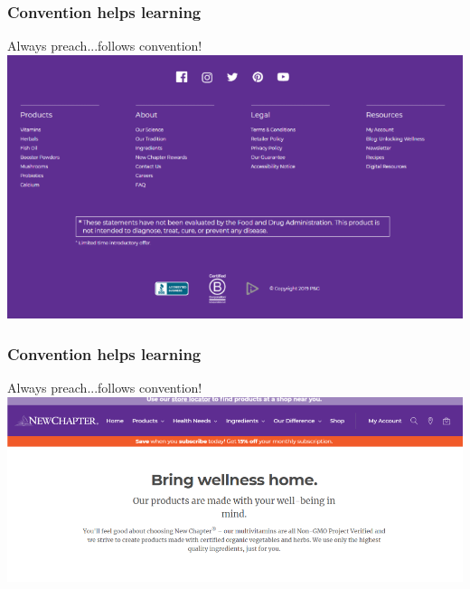 \documentclass{beamer}
\begin{document}
%
%


\begin{frame}
	\frametitle{Convention helps learning}
	Always preach...follows convention!
	\centering
	\includegraphics[width=0.8\linewidth]{image/footer}
\end{frame}

\begin{frame}
	\frametitle{Convention helps learning}
	Always preach...follows convention!
	\centering
	\includegraphics[width=0.8\linewidth]{image/navbar}
\end{frame}
\end{document}
